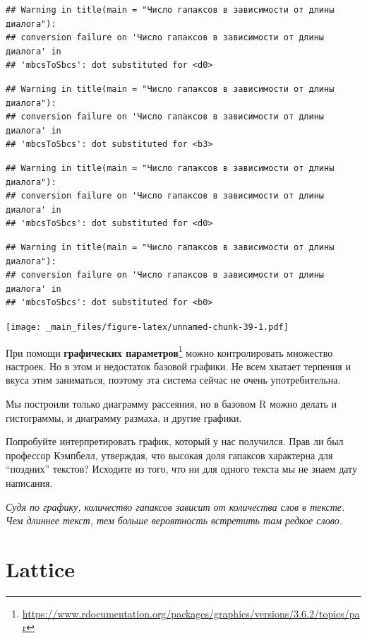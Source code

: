 \documentclass[
]{book}
\theoremstyle{definition}
\theoremstyle{definition}
\theoremstyle{definition}
\theoremstyle{definition}
\theoremstyle{remark}
\begin{document}
\begin{verbatim}
## Warning in title(main = "Число гапаксов в зависимости от длины диалога"):
## conversion failure on 'Число гапаксов в зависимости от длины диалога' in
## 'mbcsToSbcs': dot substituted for <d0>
\end{verbatim}

\begin{verbatim}
## Warning in title(main = "Число гапаксов в зависимости от длины диалога"):
## conversion failure on 'Число гапаксов в зависимости от длины диалога' in
## 'mbcsToSbcs': dot substituted for <b3>
\end{verbatim}

\begin{verbatim}
## Warning in title(main = "Число гапаксов в зависимости от длины диалога"):
## conversion failure on 'Число гапаксов в зависимости от длины диалога' in
## 'mbcsToSbcs': dot substituted for <d0>
\end{verbatim}

\begin{verbatim}
## Warning in title(main = "Число гапаксов в зависимости от длины диалога"):
## conversion failure on 'Число гапаксов в зависимости от длины диалога' in
## 'mbcsToSbcs': dot substituted for <b0>
\end{verbatim}

\texttt{[image: \_main\_files/figure-latex/unnamed-chunk-39-1.pdf]}

При помощи \textbf{графических параметров}\footnote{\url{https://www.rdocumentation.org/packages/graphics/versions/3.6.2/topics/par}} можно контролировать множество настроек. Но в этом и недостаток базовой графики. Не всем хватает терпения и вкуса этим заниматься, поэтому эта система сейчас не очень употребительна.

Мы построили только диаграмму рассеяния, но в базовом R можно делать и гистограммы, и диаграмму размаха, и другие графики.

Попробуйте интерпретировать график, который у нас получился. Прав ли был профессор Кэмпбелл, утверждая, что высокая доля гапаксов характерна для ``поздних'' текстов? Исходите из того, что ни для одного текста мы не знаем дату написания.

{\emph{Судя по графику, количество гапаксов зависит от количества слов в тексте. Чем длиннее текст, тем больше вероятность встретить там редкое слово.}}

\hypertarget{lattice}{%
\section{Lattice}\label{lattice}}
\end{document}
